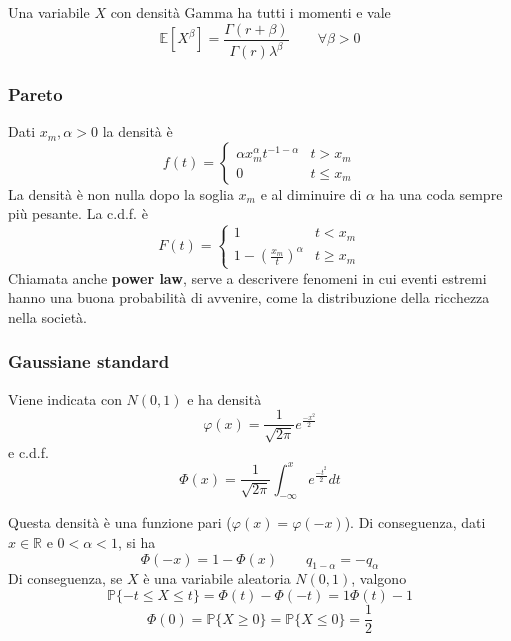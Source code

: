 \begin{proposition}
	Una variabile $X$ con densità Gamma ha tutti i momenti e vale
	\begin{equation}
		\mathbb{E}[X^\beta]=\frac{\Gamma(r + \beta)}{\Gamma(r)\lambda^\beta} \quad\quad \forall \beta > 0
	\end{equation}
\end{proposition}

\subsubsection{Pareto}
Dati $x_m, \alpha > 0$ la densità è
\begin{equation}
	f(t) = \begin{cases}
		\alpha x_m^\alpha t^{-1-\alpha} & t> x_m \\
		0 & t \leq x_m
	\end{cases}
\end{equation}
La densità è non nulla dopo la soglia $x_m$ e al diminuire di $\alpha$ ha una coda sempre più pesante. La c.d.f. è
\begin{equation}
	F(t) = \begin{cases}
		1 & t < x_m \\
		1-(\frac{x_m}{t})^\alpha & t \geq x_m
	\end{cases}
\end{equation}
Chiamata anche \textbf{power law}, serve a descrivere fenomeni in cui eventi estremi hanno una buona probabilità di avvenire, come la distribuzione della ricchezza nella società.

\subsubsection{Gaussiane standard}
Viene indicata con $N(0,1)$ e ha densità
\begin{equation}
	\varphi(x) = \frac{1}{\sqrt{2\pi}}e^{\frac{-x^2}{2}}
\end{equation}
e c.d.f.
\begin{equation}
	\Phi(x)=\frac{1}{\sqrt{2\pi}}\int_{-\infty}^{x}e^{\frac{-t^2}{2}}dt
\end{equation}

\begin{observation}
	Questa densità è una funzione pari ($\varphi(x) = \varphi(-x)$). Di conseguenza, dati $x \in \mathbb{R}$ e $0 < \alpha < 1$, si ha
	\begin{equation}
		\Phi(-x) = 1 - \Phi(x) \quad\quad q_{1-\alpha} = -q_\alpha
	\end{equation}
	Di conseguenza, se $X$ è una variabile aleatoria $N(0,1)$, valgono
	\begin{equation}
		\mathbb{P}\{-t \leq X \leq t\} = \Phi(t) - \Phi(-t) = 1\Phi(t) -1
	\end{equation}
	\begin{equation}
		\Phi(0) = \mathbb{P}\{X \geq 0\} = \mathbb{P}\{X \leq 0\} = \frac{1}{2}
	\end{equation}
\end{observation}

